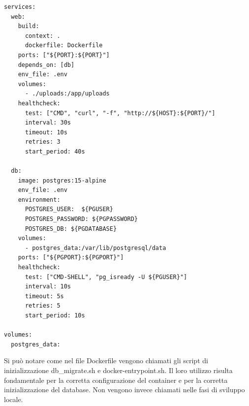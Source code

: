 \documentclass[12pt,a4paper,oneside]{report}
\begin{document}
\begin{lstlisting}[basicstyle=\small\ttfamily, breaklines=true, caption={docker-compose.yml}]
services:
  web:
    build:
      context: .
      dockerfile: Dockerfile
    ports: ["${PORT}:${PORT}"]
    depends_on: [db]
    env_file: .env  
    volumes:
      - ./uploads:/app/uploads
    healthcheck:
      test: ["CMD", "curl", "-f", "http://${HOST}:${PORT}/"]
      interval: 30s
      timeout: 10s
      retries: 3
      start_period: 40s

  db:
    image: postgres:15-alpine
    env_file: .env
    environment:
      POSTGRES_USER:  ${PGUSER}
      POSTGRES_PASSWORD: ${PGPASSWORD}
      POSTGRES_DB: ${PGDATABASE}
    volumes:
      - postgres_data:/var/lib/postgresql/data
    ports: ["${PGPORT}:${PGPORT}"]
    healthcheck:
      test: ["CMD-SHELL", "pg_isready -U ${PGUSER}"]
      interval: 10s
      timeout: 5s
      retries: 5
      start_period: 10s

volumes:
  postgres_data:
\end{lstlisting}
Si può notare come nel file Dockerfile vengono chiamati gli script di inizializzazione db\_migrate.sh e docker-entrypoint.sh.
Il loro utilizzo risulta fondamentale per la corretta configurazione del container e per la corretta inizializzazione del database.
Non vengono invece chiamati nelle fasi di sviluppo locale.
\end{document}
